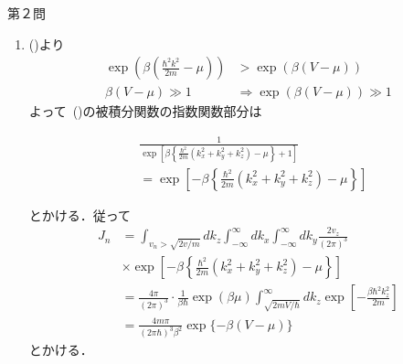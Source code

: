 \documentclass[fleqn]{jbook}
\numberwithin{equation}{section}
\numberwithin{figure}{section}
\numberwithin{table}{section}
\begin{document}
\begin{answer}{第２問}{}
\begin{enumerate}
\item
  ()より
  \begin{align*}
   \exp\left(\beta\left(\frac{\hbar^2k^2}{2m}-\mu\right)\right)&>\exp(\beta(V-\mu))\\
  \beta(V-\mu)\gg 1 &\Rightarrow \exp(\beta(V-\mu))\gg 1
  \end{align*}
  よって~()の被積分関数の指数関数部分は

  \begin{align*}
  & \frac{1}{\exp\left[\beta\left\{\frac{\hbar^2}{2m}(k_x^2+k_y^2+k_z^2)-\mu\right\}+1\right]}\\
  &= \exp\left[-\beta\left\{\frac{\hbar^2}{2m}(k_x^2+k_y^2+k_z^2)-\mu\right\}\right]
  \end{align*}

  とかける．従って
  \begin{align*}
   J_n&=\int_{v_n>\sqrt{2v/m}}dk_z \int_{-\infty}^{\infty}dk_x \int_{-\infty}^{\infty}dk_y\frac{2v_z}{(2\pi)^3}\\
  &\times \exp\left[-\beta\left\{\frac{\hbar^2}{2m}(k_x^2+k_y^2+k_z^2)-\mu\right\}\right]\\
  &=\frac{4\pi}{(2\pi)^3}\cdot\frac{1}{\beta \hbar}\exp(\beta\mu)\int_{\sqrt{2mV/\hbar}}^{\infty}dk_z\exp\left[-\frac{\beta\hbar^2k^2_z}{2m}\right]\\
  &=\frac{4m\pi}{(2\pi \hbar)^3 \beta^2}\exp\{-\beta(V-\mu)\}
  \end{align*}
  とかける．

\end{enumerate}
\end{answer}
\end{document}
